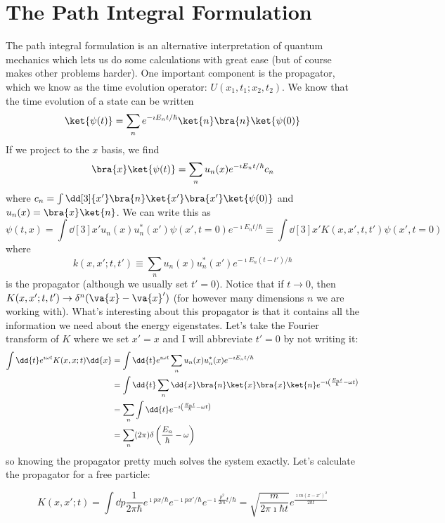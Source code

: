 \documentclass[a4paper,twoside,master.tex]{subfiles}
\begin{document}
\section{The Path Integral Formulation}
\label{sec:the_path_integral_formulation}

The path integral formulation is an alternative interpretation of quantum mechanics which lets us do some calculations with great ease (but of course makes other problems harder). One important component is the propagator, which we know as the time evolution operator: $ U(x_1, t_1; x_2, t_2) $. We know that the time evolution of a state can be written
\begin{equation}
    \ket{\psi(t)} = \sum_n e^{- \imath E_n t / \hbar}\ket{n}\bra{n}\ket{\psi(0)}
\end{equation}
If we project to the $ x $ basis, we find
\begin{equation}
    \bra{x}\ket{\psi(t)} = \sum_n u_n(x) e^{- \imath E_n t / \hbar} c_n
\end{equation}
where $ c_n = \int \dd[3]{x'}\bra{n}\ket{x'}\bra{x'}\ket{\psi(0)} $ and $ u_n(x) =\bra{x}\ket{n} $. We can write this as
\begin{equation}
    \psi(t,x) = \int \dd[3]{x'} u_n(x) u_n^*(x') \psi(x', t=0) e^{- \imath E_n t / \hbar} \equiv \int \dd[3]{x'} K(x,x',t,t') \psi(x',t=0)
\end{equation}
where
\begin{equation}
    k(x,x';t,t') \equiv \sum_n u_n(x) u_n^*(x') e^{- \imath E_n (t-t') / \hbar}
\end{equation}
is the propagator (although we usually set $ t'=0 $). Notice that if $ t \to 0 $, then $ K(x,x';t,t') \to \delta^n(\va{x} - \va{x}') $ (for however many dimensions $ n $ we are working with). What's interesting about this propagator is that it contains all the information we need about the energy eigenstates. Let's take the Fourier transform of $ K $ where we set $ x' = x $ and I will abbreviate $ t'=0 $ by not writing it:
\begin{align}
    \int \dd{t} e^{\imath \omega t} K(x,x;t) \dd{x} &= \int \dd{t} e^{\imath \omega t} \sum_n u_n(x) u_n^*(x) e^{- \imath E_n t / \hbar} \\
    &= \int \dd{t} \sum_n \dd{x}\bra{n}\ket{x}\bra{x}\ket{n} e^{- \imath \left( \frac{E_n t}{\hbar} - \omega t \right)} \\
    &= \sum_n \int \dd{t} e^{- \imath \left( \frac{E_n t}{\hbar} - \omega t \right)} \\
    &= \sum_n(2 \pi) \delta \left( \frac{E_n}{\hbar} - \omega \right)
\end{align}
so knowing the propagator pretty much solves the system exactly. Let's calculate the propagator for a free particle:

\begin{equation}
    K(x,x';t) = \int \dd{p} \frac{1}{2 \pi \hbar} e^{\imath px / \hbar} e^{- \imath p x' / \hbar} e^{- \imath \frac{p^2}{2m} t / \hbar} = \sqrt{\frac{m}{2 \pi \imath \hbar t}} e^{\frac{\imath m (x-x')^2}{2 \hbar t}}
\end{equation}
\end{document}
